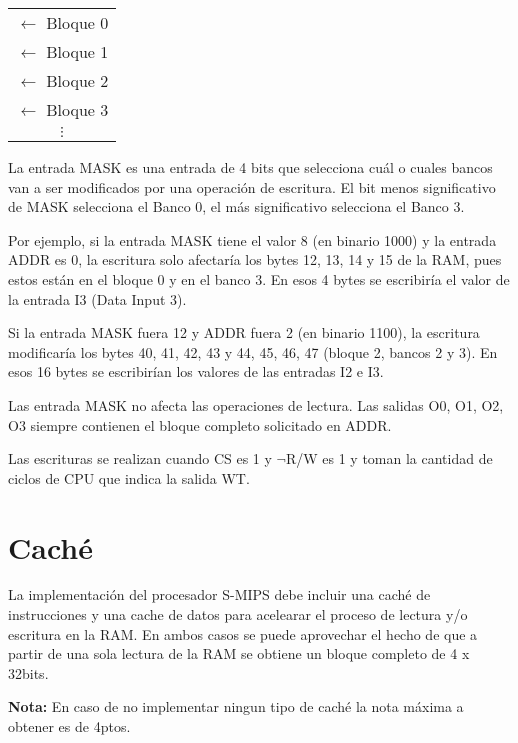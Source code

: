 \documentclass[letterpaper,11pt]{scrartcl}
\begin{document}
\begin{center}
\begin{minipage}[c]{5.5in}
\begin{multicols}{5}
    \phantom{Banco X}
    \begin{tabular}{c}
     $\leftarrow$ Bloque 0 \\
     $\leftarrow$ Bloque 1 \\
     $\leftarrow$ Bloque 2 \\
     $\leftarrow$ Bloque 3 \\
     $\vdots$
    \end{tabular}

   \end{multicols}
  \end{minipage}
  \end{center}
  
  La entrada MASK es una entrada de 4 bits que selecciona cuál o cuales bancos
  van a ser modificados por una operación de escritura.  El bit menos
  significativo de MASK selecciona el Banco 0, el más significativo selecciona el
  Banco 3.
  
  Por ejemplo, si la entrada MASK tiene el valor 8 (en binario 1000) y la entrada
  ADDR es 0, la escritura solo afectaría los bytes 12, 13, 14 y 15 de la RAM, pues estos
  están en el bloque 0 y en el banco 3.  En esos 4 bytes se escribiría el valor
  de la entrada I3 (Data Input 3).
  
  Si la entrada MASK fuera 12 y ADDR fuera 2 (en binario 1100), la escritura
  modificaría los bytes 40, 41, 42, 43 y 44, 45, 46, 47 (bloque 2, bancos 2 y 3).  
  En esos 16 bytes se escribirían los valores de las entradas I2 e I3.
  
  Las entrada MASK no afecta las operaciones de lectura. Las salidas O0, O1, O2, O3
  siempre contienen el bloque completo solicitado en ADDR.
  
  Las escrituras se realizan cuando CS es 1 y $\neg$R/W es 1 y toman la cantidad de
  ciclos de CPU que indica la salida WT.  
  
\section*{Caché}
  
  La implementación del procesador S-MIPS debe incluir una caché de instrucciones y 
  una cache de datos para acelearar el proceso de lectura y/o escritura en la RAM. En ambos casos se puede
  aprovechar el hecho de que a partir de una sola lectura de la RAM se obtiene un bloque completo de 4 x 32bits.

  \textbf{Nota:} En caso de no implementar ningun tipo de caché la nota máxima a obtener es de 4ptos.
  
\end{document}
